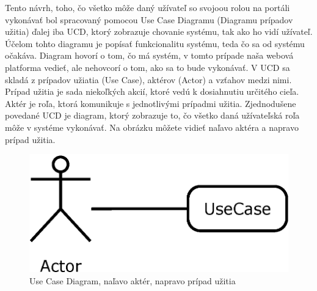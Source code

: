 Tento návrh, toho, čo všetko môže daný užívateľ so svojoou rolou na portáli vykonávať bol spracovaný pomocou Use Case Diagramu (Diagramu prípadov užitia) ďalej iba UCD, ktorý zobrazuje chovanie systému, tak ako ho vidí užívateľ. Účelom tohto diagramu je popísať funkcionalitu systému, teda čo sa od systému očakáva. Diagram hovorí o tom, čo má systém, v tomto prípade naša webová platforma vedieť, ale nehovcorí o tom, ako sa to bude vykonávať. V UCD sa skladá z prípadov užiatia (Use Case), aktérov (Actor) a vzťahov medzi nimi. Prípad užitia je sada niekoľkých akcií, ktoré vedú k dosiahnutiu určitého cieľa. Aktér je roľa, ktorá komunikuje s jednotlivými prípadmi užitia. Zjednodušene povedané UCD je diagram, ktorý zobrazuje to, čo všetko daná užívateľská roľa môže v systéme vykonávať. Na obrázku môžete vidieť naľavo aktéra a napravo prípad užitia. 
\begin{figure}[h]
  \centering
  \includegraphics[scale=0.4]{fig/ucd.eps}
  \caption{Use Case Diagram, naľavo aktér, napravo prípad užitia}
  \label{fig:ucd}
\end{figure}


